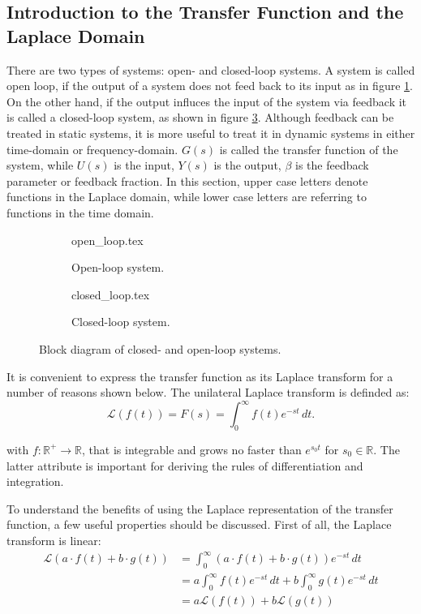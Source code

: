 \subsection{Introduction to the Transfer Function and the Laplace Domain}
\label{sec:transfer_function}
There are two types of systems: open- and closed-loop systems. A system is called open loop, if the output of a system does not feed back to its input as in figure \ref{fig:open_loop}. On the other hand, if the output influces the input of the system via feedback it is called a closed-loop system, as shown in figure \ref{fig:closed_loop}. Although feedback can be treated in static systems, it is more useful to treat it in dynamic systems in either time-domain or frequency-domain. $G(s)$ is called the transfer function of the system, while $U(s)$ is the input, $Y(s)$ is the output, $\beta$ is the feedback parameter or feedback fraction. In this section, upper case letters  denote functions in the Laplace domain, while lower case letters are referring to functions in the time domain.

\begin{figure}[ht]
    \centering
    \begin{subfigure}{0.4\linewidth}
        \centering
        {open_loop.tex}
        \caption{Open-loop system.}
        \label{fig:open_loop}
    \end{subfigure}
    \begin{subfigure}{0.4\linewidth}
        \centering
        {closed_loop.tex}
        \caption{Closed-loop system.}
        \label{fig:closed_loop}
    \end{subfigure}
    \caption{Block diagram of closed- and open-loop systems.}
\end{figure}

It is convenient to express the transfer function as its Laplace transform for a number of reasons shown below. The unilateral Laplace transform is definded as:
\begin{equation}
    \mathscr{L}\left( f(t) \right) = F(s) = \int_0^\infty f(t) e^{-st}\,dt.
\end{equation}

with $f: \mathbb{R}^+ \to \mathbb{R}$, that is integrable and grows no faster than $e^{s_0t}$ for $s_0 \in \mathbb{R}$. The latter attribute is important for deriving the rules of differentiation and integration.

To understand the benefits of using the Laplace representation of the transfer function, a few useful properties should be discussed. First of all, the Laplace transform is linear:
\begin{align}
    \mathscr{L}\left(a \cdot f(t) + b \cdot g(t) \right) &= \int_0^\infty (a \cdot f(t) + b \cdot g(t)) e^{-st}\,dt \nonumber\\
    &= a \int_0^\infty f(t) e^{-st}\,dt + b \int_0^\infty g(t) e^{-st}\,dt \nonumber\\
    &= a \mathscr{L}\left(f(t)\right) + b \mathscr{L}\left(g(t)\right)
\end{align}


